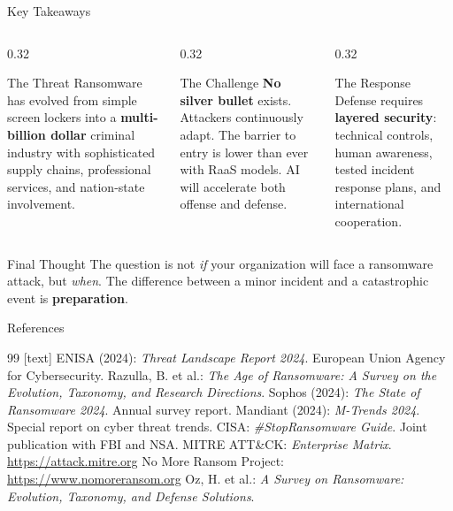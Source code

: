 \documentclass[aspectratio=169]{beamer}
\begin{document}
\begin{frame}{Key Takeaways}
  \begin{columns}[T]
    \begin{column}{0.32\textwidth}
      \begin{block}{The Threat}
        \footnotesize
        Ransomware has evolved from simple screen lockers into a \textbf{multi-billion dollar} criminal industry with sophisticated supply chains, professional services, and nation-state involvement.
      \end{block}
    \end{column}
    \begin{column}{0.32\textwidth}
      \begin{block}{The Challenge}
        \footnotesize
        \textbf{No silver bullet} exists. Attackers continuously adapt. The barrier to entry is lower than ever with RaaS models. AI will accelerate both offense and defense.
      \end{block}
    \end{column}
    \begin{column}{0.32\textwidth}
      \begin{block}{The Response}
        \footnotesize
        Defense requires \textbf{layered security}: technical controls, human awareness, tested incident response plans, and international cooperation.
      \end{block}
    \end{column}
  \end{columns}

  \vspace{0.8em}

  \begin{dangerbox}{Final Thought}
    The question is not \textit{if} your organization will face a ransomware attack, but \textit{when}. The difference between a minor incident and a catastrophic event is \textbf{preparation}.
  \end{dangerbox}
\end{frame}

\begin{frame}{References}
  \begin{thebibliography}{99}
    [text]
     ENISA (2024): \textit{Threat Landscape Report 2024}. European Union Agency for Cybersecurity.
     Razulla, B. et al.: \textit{The Age of Ransomware: A Survey on the Evolution, Taxonomy, and Research Directions}.
     Sophos (2024): \textit{The State of Ransomware 2024}. Annual survey report.
     Mandiant (2024): \textit{M-Trends 2024}. Special report on cyber threat trends.
     CISA: \textit{\#StopRansomware Guide}. Joint publication with FBI and NSA.
     MITRE ATT\&CK: \textit{Enterprise Matrix}. \url{https://attack.mitre.org}
     No More Ransom Project: \url{https://www.nomoreransom.org}
     Oz, H. et al.: \textit{A Survey on Ransomware: Evolution, Taxonomy, and Defense Solutions}.
  \end{thebibliography}
\end{frame}
\end{document}
